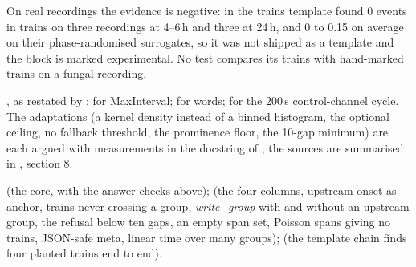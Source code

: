 On real recordings the evidence is negative: in
 the trains template found 0 events in
trains on three recordings at 4--6\,h and three at 24\,h, and 0 to 0.15 on average on their
phase-randomised surrogates, so it was not shipped as a template and the block is marked
experimental. No test compares its trains with hand-marked trains on a fungal recording.

\citet{pasquale2010selfadapting}, as restated by \citet{cotterill2016comparison};
\citet{cotterill2016comparison} for MaxInterval; \citet{adamatzky2022language} for words;
\citet{buffi2025electrical} for the 200\,s control-channel cycle. The adaptations (a kernel
density instead of a binned histogram, the optional ceiling, no fallback threshold, the
prominence floor, the 10-gap minimum) are each argued with measurements in the docstring of
; the sources are summarised in
, section 8.

 (the core, with the answer checks above);
 (the four columns, upstream onset as anchor, trains never
crossing a group, \emph{write\_group} with and without an upstream group, the refusal below
ten gaps, an empty span set, Poisson spans giving no trains, JSON-safe meta, linear time over
many groups);  (the template chain finds four
planted trains end to end).
